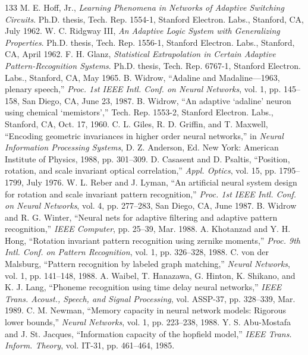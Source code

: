 \documentclass[10pt,twocolumn]{article}
\begin{document}
\begin{thebibliography}{133}
 M. E. Hoff, Jr., \textit{Learning Phenomena in Networks of Adaptive Switching Circuits}. Ph.D. thesis, Tech. Rep. 1554-1, Stanford Electron. Labs., Stanford, CA, July 1962.
 W. C. Ridgway III, \textit{An Adaptive Logic System with Generalizing Properties}. Ph.D. thesis, Tech. Rep. 1556-1, Stanford Electron. Labs., Stanford, CA, April 1962.
 F. H. Glanz, \textit{Statistical Extrapolation in Certain Adaptive Pattern-Recognition Systems}. Ph.D. thesis, Tech. Rep. 6767-1, Stanford Electron. Labs., Stanford, CA, May 1965.
 B. Widrow, ``Adaline and Madaline---1963, plenary speech,'' \textit{Proc. 1st IEEE Intl. Conf. on Neural Networks}, vol. 1, pp. 145--158, San Diego, CA, June 23, 1987.
 B. Widrow, ``An adaptive `adaline' neuron using chemical `memistors','' Tech. Rep. 1553-2, Stanford Electron. Labs., Stanford, CA, Oct. 17, 1960.
 C. L. Giles, R. D. Griffin, and T. Maxwell, ``Encoding geometric invariances in higher order neural networks,'' in \textit{Neural Information Processing Systems}, D. Z. Anderson, Ed. New York: American Institute of Physics, 1988, pp. 301--309.
 D. Casasent and D. Psaltis, ``Position, rotation, and scale invariant optical correlation,'' \textit{Appl. Optics}, vol. 15, pp. 1795--1799, July 1976.
 W. L. Reber and J. Lyman, ``An artificial neural system design for rotation and scale invariant pattern recognition,'' \textit{Proc. 1st IEEE Intl. Conf. on Neural Networks}, vol. 4, pp. 277--283, San Diego, CA, June 1987.
 B. Widrow and R. G. Winter, ``Neural nets for adaptive filtering and adaptive pattern recognition,'' \textit{IEEE Computer}, pp. 25--39, Mar. 1988.
 A. Khotanzad and Y. H. Hong, ``Rotation invariant pattern recognition using zernike moments,'' \textit{Proc. 9th Intl. Conf. on Pattern Recognition}, vol. 1, pp. 326--328, 1988.
 C. von der Malsburg, ``Pattern recognition by labeled graph matching,'' \textit{Neural Networks}, vol. 1, pp. 141--148, 1988.
 A. Waibel, T. Hanazawa, G. Hinton, K. Shikano, and K. J. Lang, ``Phoneme recognition using time delay neural networks,'' \textit{IEEE Trans. Acoust., Speech, and Signal Processing}, vol. ASSP-37, pp. 328--339, Mar. 1989.
 C. M. Newman, ``Memory capacity in neural network models: Rigorous lower bounds,'' \textit{Neural Networks}, vol. 1, pp. 223--238, 1988.
 Y. S. Abu-Mostafa and J. St. Jacques, ``Information capacity of the hopfield model,'' \textit{IEEE Trans. Inform. Theory}, vol. IT-31, pp. 461--464, 1985.

\end{thebibliography}
\end{document}
